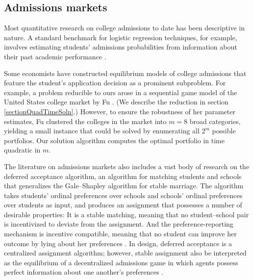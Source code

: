 \subsection{Admissions markets}

Most quantitative research on college admissions to date has been descriptive in nature. A standard benchmark for logistic regression techniques, for example, involves estimating students' admissions probabilities from information about their past academic performance \cite{acharyaetal2019,lim2013}. 


Some economists have constructed equilibrium models of college admissions that feature the student's application decision as a prominent subproblem. For example, a problem reducible to ours arose in a sequential game model of the United States college market by Fu \cite{fu2014}. (We describe the reduction in section \ref{sectionQuadTimeSoln}.) However, to ensure the robustness of her parameter estimates, Fu clustered the colleges in the market into $m=8$ broad categories, yielding a small instance that could be solved by enumerating all $2^m$ possible portfolios. Our solution algorithm computes the optimal portfolio in time quadratic in $m$. 

The literature on admissions markets also includes a vast body of research on the deferred acceptance algorithm, an algorithm for matching students and schools that generalizes the Gale--Shapley algorithm for stable marriage. The algorithm takes students' ordinal preferences over schools and schools' ordinal preferences over students as input, and produces an assignment that possesses a number of desirable properties: It is a stable matching, meaning that no student--school pair is incentivized to deviate from the assignment. And the preference-reporting mechanism is incentive compatible, meaning that no student can improve her outcome by lying about her preferences \cite{galeandshapley1962,roth1982}. In design, deferred acceptance is a centralized assignment algorithm; however, stable assignment also be interpreted as the equilibrium of a decentralized admissions game in which agents possess perfect information about one another's preferences \cite{azevedoandleshno2016}.

